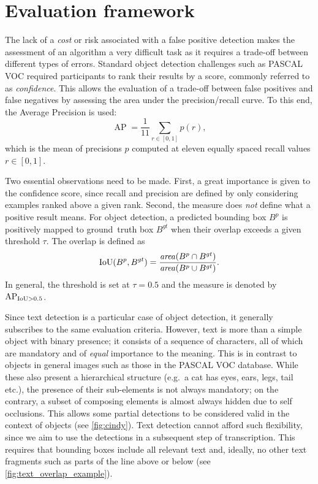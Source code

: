 
\section{Evaluation framework}\label{sec:detection_eval}
	The lack of a \emph{cost} or risk associated with a false positive detection makes the assessment of an algorithm a very difficult task as it requires a trade-off between different types of errors. Standard object detection challenges such as PASCAL VOC \citep{pascal_voc} required participants to rank their results by a score, commonly referred to as \emph{confidence}. This allows the evaluation of a trade-off between false positives and false negatives by assessing the area under the precision/recall curve. To this end, the Average Precision is used:\[
		\operatorname{AP} = \frac{1}{11} \sum_{r \in [0,1]} p(r),
	\] which is the mean of precisions \(p\) computed at eleven equally spaced recall values \(r \in [0,1]\).

	Two essential observations need to be made. First, a great importance is given to the confidence score, since recall and precision are defined by only considering examples ranked above a given rank. Second, the measure does \emph{not} define what a positive result means. For object detection, a predicted bounding box \(B^p\) is positively mapped to \mbox{ground truth} box \(B^{gt}\) when their overlap exceeds a given threshold \(\tau\). The overlap is defined as \[
		\operatorname{IoU}(B^p, B^{gt}) = \frac{\mathit{area}(B^p \cap B^{gt})}{\mathit{area}(B^p \cup B^{gt})}.
	\] In general, the threshold is set at \(\tau = 0.5\) and the measure is denoted by \(\operatorname{\operatorname{AP}_{\operatorname{IoU} > 0.5}}\).


	Since text detection is a particular case of object detection, it generally subscribes to the same evaluation criteria. However, text is more than a simple object with binary presence; it consists of a sequence of characters, all of which are mandatory and of \emph{equal} importance to the meaning. This is in contrast to objects in general images such as those in the PASCAL VOC database. While these also present a hierarchical structure (e.g.\ a cat has eyes, ears, legs, tail etc.), the presence of their sub-elements is not always mandatory; on the contrary, a subset of composing elements is almost always hidden due to self occlusions. This allows some partial detections to be considered valid in the context of objects (see \autoref{fig:cindy}). Text detection cannot afford such flexibility, since we aim to use the detections in a subsequent step of transcription. This requires that bounding boxes include all relevant text and, ideally, no other text fragments such as parts of the line above or below (see \autoref{fig:text_overlap_example}).

